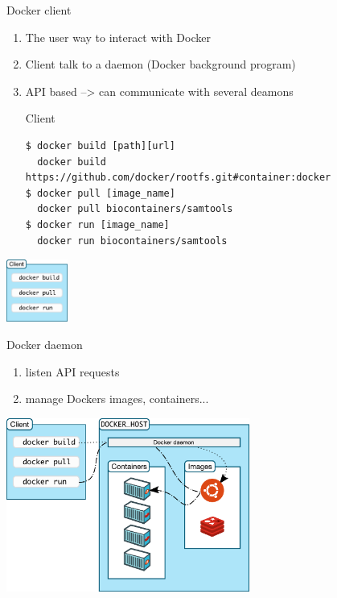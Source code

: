 \begin{frame}[fragile]{Docker client}
\begin{enumerate}
\item<1-> The user way to interact with Docker
\item<2-> Client talk to a daemon (Docker background program)
\item<3-> API based --> can communicate with several deamons
\begin{block}{Client}
\begin{verbatim}
$ docker build [path][url] 
  docker build https://github.com/docker/rootfs.git#container:docker
$ docker pull [image_name]
  docker pull biocontainers/samtools
$ docker run [image_name]
  docker run biocontainers/samtools
\end{verbatim}
\end{block}
\end{enumerate}

\begin{center}
\includegraphics[width=0.15\textwidth]{images/docker_arch_1.pdf}
\end{center}
\end{frame}

\begin{frame}[<+->]{Docker daemon}
\begin{enumerate}
\item listen API requests
\item manage Dockers images, containers...
\end{enumerate}
\centering\includegraphics[width=0.6\textwidth]{images/docker_arch_2.pdf}
\end{frame}

